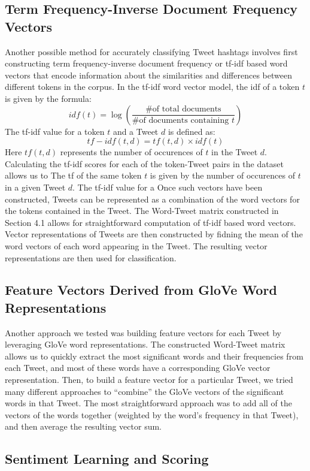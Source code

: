 \documentclass[11pt]{article}
\begin{document}
\subsection{Term Frequency-Inverse Document Frequency Vectors}

Another possible method for accurately classifying Tweet hashtags involves first constructing term frequency-inverse document frequency or tf-idf based word vectors that encode information about the similarities and differences between different tokens in the corpus. In the tf-idf word vector model, the idf of a token $t$ is given by the formula:
\[
idf(t) = \log \left( \frac{ \text{\# of total documents}}{ \text{\# of documents containing }t } \right)
\]
The tf-idf value for a token $t$ and a Tweet $d$ is defined as:
\[
tf-idf(t, d) = tf(t, d) \times idf(t)
\]
Here $tf(t,d)$ represents the number of occurences of $t$ in the Tweet $d$. Calculating the tf-idf scores for each of the token-Tweet pairs in the dataset allows us to
The tf of the same token $t$ is given by the number of occurences of $t$ in a given Tweet $d$. The tf-idf value for a
Once such vectors have been constructed, Tweets can be represented as a combination of the word vectors for the tokens contained in the Tweet. The Word-Tweet matrix constructed in Section 4.1 allows for straightforward computation of tf-idf based word vectors. Vector representations of Tweets are then constructed by fidning the mean of the word vectors of each word appearing in the Tweet. The resulting vector representations are then used for classification.

\subsection{Feature Vectors Derived from GloVe Word Representations}

Another approach we tested was building feature vectors for each Tweet by leveraging GloVe word representations. The constructed Word-Tweet matrix allows us to quickly extract the most significant words and their frequencies from each Tweet, and most of these words have a corresponding GloVe vector representation. Then, to build a feature vector for a particular Tweet, we tried many different approaches to “combine” the GloVe vectors of the significant words in that Tweet. The most straightforward approach was to add all of the vectors of the words together (weighted by the word’s frequency in that Tweet), and then average the resulting vector sum.

\subsection{Sentiment Learning and Scoring}
\end{document}
